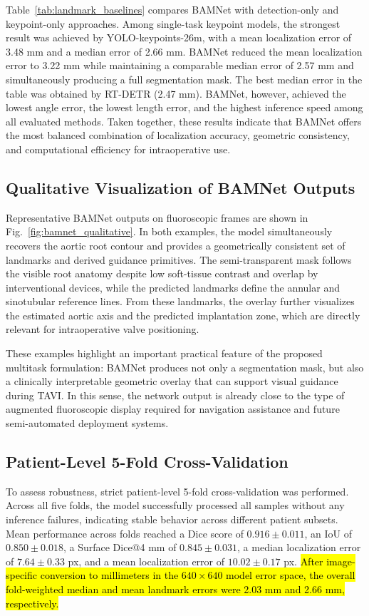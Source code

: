 \documentclass[utf8]{FrontiersinHarvard}
\begin{document}
Table~\ref{tab:landmark_baselines} compares BAMNet with detection-only and keypoint-only approaches. Among single-task keypoint models, 
the strongest result was achieved by YOLO-keypoints-26m, with a mean localization error of 3.48 mm and a median error of 2.66 mm. BAMNet 
reduced the mean localization error to 3.22 mm while maintaining a comparable median error of 2.57 mm and simultaneously producing a 
full segmentation mask. The best median error in the table was obtained by RT-DETR (2.47 mm). BAMNet, however, achieved the lowest 
angle error, the lowest length error, and the highest inference speed among all evaluated methods. Taken together, these results 
indicate that BAMNet offers the most balanced combination of localization accuracy, geometric consistency, and computational efficiency 
for intraoperative use.

\subsection{Qualitative Visualization of BAMNet Outputs}

Representative BAMNet outputs on fluoroscopic frames are shown in Fig.~\ref{fig:bamnet_qualitative}. In both examples, the model 
simultaneously recovers the aortic root contour and provides a geometrically consistent set of landmarks and derived guidance primitives. 
The semi-transparent mask follows the visible root anatomy despite low soft-tissue contrast and overlap by interventional devices, 
while the predicted landmarks define the annular and sinotubular reference lines. From these landmarks, the overlay further visualizes 
the estimated aortic axis and the predicted implantation zone, which are directly relevant for intraoperative valve positioning.

These examples highlight an important practical feature of the proposed multitask formulation: BAMNet produces not only a 
segmentation mask, but also a clinically interpretable geometric overlay that can support visual guidance during TAVI. In this 
sense, the network output is already close to the type of augmented fluoroscopic display required for navigation assistance and 
future semi-automated deployment systems.

\subsection{Patient-Level 5-Fold Cross-Validation}
\label{subsec:crossval}

To assess robustness, strict patient-level 5-fold cross-validation was performed. Across all five folds, the model successfully
processed all samples without any inference failures, indicating stable behavior across different patient subsets. Mean performance
across folds reached a Dice score of $0.916 \pm 0.011$, an IoU of $0.850 \pm 0.018$, a Surface Dice@4 mm of $0.845 \pm 0.031$, a
median localization error of $7.64 \pm 0.33$ px, and a mean localization error of $10.02 \pm 0.17$ px. \hl{After image-specific conversion to millimeters in the $640 \times 640$ model error space, the overall fold-weighted median and mean landmark errors were 2.03 mm and 2.66 mm, respectively.}
\end{document}
